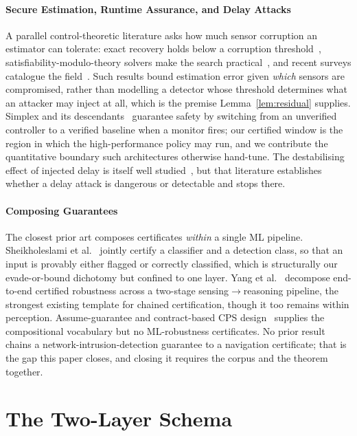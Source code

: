 \paragraph{Secure Estimation, Runtime Assurance, and Delay Attacks}
A parallel control-theoretic literature asks how much sensor corruption an
estimator can tolerate: exact recovery holds below a corruption
threshold~\cite{fawzi2014secure}, satisfiability-modulo-theory solvers make the
search practical~\cite{shoukry2017smt}, and recent surveys catalogue the
field~\cite{ding2021survey}. Such results bound estimation error given
\emph{which} sensors are compromised, rather than modelling a detector whose
threshold determines what an attacker may inject at all, which is the premise
Lemma~\ref{lem:residual} supplies. Simplex and its
descendants~\cite{sha2001simplex,mehmood2022blackbox,cofer2020rta} guarantee
safety by switching from an unverified controller to a verified baseline when a
monitor fires; our certified window is the region in which the high-performance
policy may run, and we contribute the quantitative boundary such architectures
otherwise hand-tune. The destabilising effect of injected delay is itself well
studied~\cite{lou2019timedelay,etd2023uav,datamut2026}, but that literature
establishes whether a delay attack is dangerous or detectable and stops there.

\paragraph{Composing Guarantees}
The closest prior art composes certificates \emph{within} a single ML pipeline.
Sheikholeslami et al.~\cite{sheikholeslami2021provably} jointly certify a
classifier and a detection class, so that an input is provably either flagged or
correctly classified, which is structurally our evade-or-bound dichotomy but
confined to one layer. Yang et al.~\cite{yang2022sensing} decompose end-to-end certified
robustness across a two-stage sensing$\to$reasoning pipeline, the strongest
existing template for chained certification, though it too remains within
perception. Assume-guarantee and contract-based CPS design~\cite{pacti2024}
supplies the compositional vocabulary but no ML-robustness certificates. No
prior result chains a network-intrusion-detection guarantee to a navigation
certificate; that is the gap this paper closes, and closing it requires the
corpus and the theorem together.

\section{The Two-Layer Schema}
\label{sec:schema}
